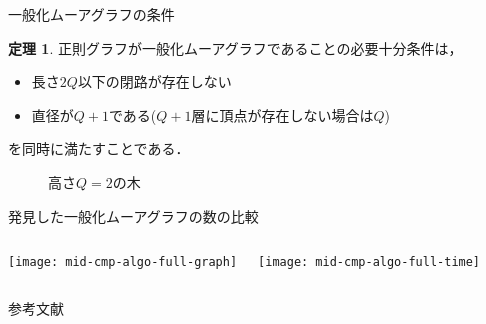 \documentclass[dvipdfmx]{beamer}
\theoremstyle{definition}
\newtheorem{thm}{定理}
\begin{document}
\appendix
\begin{frame}{一般化ムーアグラフの条件}
  \begin{thm}
    正則グラフが一般化ムーアグラフであることの必要十分条件は，
    \begin{itemize}
    \item 長さ$2Q$以下の閉路が存在しない
    \item 直径が$Q+1$である($Q+1$層に頂点が存在しない場合は$Q$)
    \end{itemize}
    を同時に満たすことである．
  \end{thm}
  \begin{figure}
    \centering
    \def\svgwith{.4\textwidth}
    \resizebox{.4\textwidth}{!}{
      
    }
    \caption{高さ$Q=2$の木}
  \end{figure}
\end{frame}

\begin{frame}{発見した一般化ムーアグラフの数の比較}
  \begin{columns}
    \begin{minipage}[t]{.5\textwidth}
      \centering
      \texttt{[image: mid-cmp-algo-full-graph]}
      \label{fig:full-graph}
    \end{minipage}
    \hspace{1ex}
    \begin{minipage}[t]{.5\textwidth}
      \centering
      \texttt{[image: mid-cmp-algo-full-time]}
      \label{fig:full-time}
    \end{minipage}
  \end{columns}
\end{frame}

\begin{frame}[allowframebreaks]{参考文献}
  
\end{frame}
\end{document}
